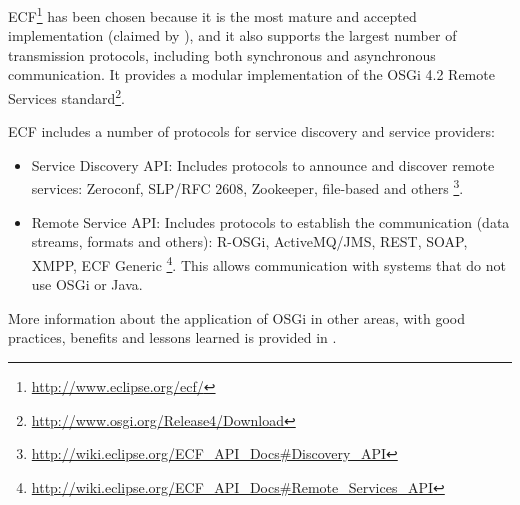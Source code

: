ECF\footnote{\url{http://www.eclipse.org/ecf/}} has
 been chosen because it is the most mature and accepted implementation
 (claimed by  \cite{petzold2011dynamic}), %
and it also supports the largest number of transmission protocols,
including both synchronous and asynchronous communication. It provides
a modular implementation of the OSGi 4.2 Remote Services
standard\footnote{\url{http://www.osgi.org/Release4/Download}}. %

ECF includes a number of protocols for service discovery and service providers:
\begin{itemize}
\item Service Discovery API: Includes protocols to announce and discover remote services: Zeroconf, SLP/RFC 2608, Zookeeper, file-based and others \footnote{\url{http://wiki.eclipse.org/ECF_API_Docs\#Discovery_API}}.
\item Remote Service API: Includes protocols to establish the communication (data streams, formats and others): R-OSGi, ActiveMQ/JMS, REST, SOAP, XMPP, ECF Generic \footnote{\url{http://wiki.eclipse.org/ECF_API_Docs\#Remote_Services_API}}. This allows communication with systems that do not use OSGi or Java.
\end{itemize}

More information about the application of OSGi in other areas, with
good practices, benefits and lessons learned is provided in \cite{GarciaSanchez2013Gateway}. 





